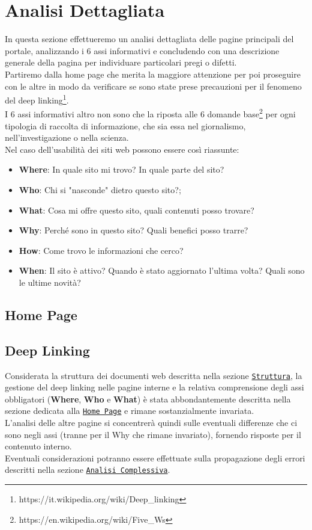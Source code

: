 \documentclass[10pt,a4paper]{article}
\begin{document}
\section{Analisi Dettagliata}
In questa sezione effettueremo un analisi dettagliata delle pagine principali del portale, analizzando i 6 assi informativi e concludendo con una descrizione generale della pagina per individuare particolari pregi o difetti. \\
Partiremo dalla home page che merita la maggiore attenzione per poi proseguire con le altre in modo da verificare se sono state prese precauzioni per il fenomeno del deep linking\footnote{https://it.wikipedia.org/wiki/Deep\_linking}. \\
I 6 assi informativi altro non sono che la riposta alle 6 domande base\footnote{https://en.wikipedia.org/wiki/Five\_Ws} per ogni tipologia di raccolta di informazione, che sia essa nel giornalismo, nell'investigazione o nella scienza. \\
Nel caso dell'usabilità dei siti web possono essere così riassunte:
\begin{itemize}
	\item \textbf{Where}: In quale sito mi trovo? In quale parte del sito?
	\item \textbf{Who}: Chi si "nasconde" dietro questo sito?;
	\item \textbf{What}: Cosa mi offre questo sito, quali contenuti posso trovare?
	\item \textbf{Why}: Perché sono in questo sito? Quali benefici posso trarre?
	\item \textbf{How}: Come trovo le informazioni che cerco?
	\item \textbf{When}: Il sito è attivo? Quando è stato aggiornato l'ultima volta? Quali sono le ultime novità?
\end{itemize}
\subsection{Home Page}
\label{sec-home-page}

\subsection{Deep Linking}
Considerata la struttura dei documenti web descritta nella sezione \hyperref[sec-struttura]{\texttt{Struttura}}, la gestione del deep linking nelle pagine interne e la relativa comprensione degli assi obbligatori (\textbf{Where}, \textbf{Who} e \textbf{What}) è stata abbondantemente descritta nella sezione dedicata alla \hyperref[sec-home-page]{\texttt{Home Page}} e rimane sostanzialmente invariata. \\
L'analisi delle altre pagine si concentrerà quindi sulle eventuali differenze che ci sono negli assi (tranne per il Why che rimane invariato), fornendo risposte per il contenuto interno. \\
Eventuali considerazioni potranno essere effettuate sulla propagazione degli errori descritti nella sezione \hyperref[sec-complessiva]{\texttt{Analisi Complessiva}}.
\end{document}

